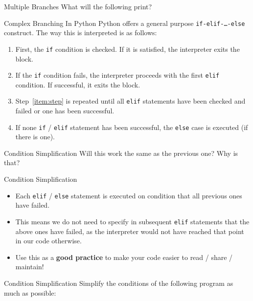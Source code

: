 \documentclass[aspectratio=169, 12pt, xcolor=table]{beamer}
\begin{document}
	\begin{frame}{Multiple Branches}
		What will the following print?
		
	\end{frame}

	\begin{frame}{Complex Branching In Python}
		Python offers a general purpose \texttt{if-elif-\ldots-else} construct. The way this is interpreted is as follows:
		\begin{enumerate}
			\item First, the \texttt{if} condition is checked. If it is satisfied, the interpreter exits the block.
			\item\label{item:step} If the \texttt{if} condition fails, the interpreter proceeds with the first \texttt{elif} condition. If successful, it exits the block.
			\item Step~\ref{item:step} is repeated until all \texttt{elif} statements have been checked and failed or one has been successful.
			\item If none \texttt{if} / \texttt{elif} statement has been successful, the \texttt{else} case is executed (if there is one).
		\end{enumerate}
	\end{frame}

	\begin{frame}{Condition Simplification}
		Will this work the same as the previous one?
		\pause
		Why is that?
	\end{frame}

	\begin{frame}{Condition Simplification}
		\begin{itemize}
			\item Each \texttt{elif} / \texttt{else} statement is executed on condition that all previous ones have failed.
			\item This means we do not need to specify in subsequent \texttt{elif} statements that the above ones have failed, as the interpreter would not have reached that point in our code otherwise.
			\item Use this as a \textbf{good practice} to make your code easier to read / share / maintain!
		\end{itemize}
	\end{frame}

	\begin{frame}{Condition Simplification}
		Simplify the conditions of the following program as much as possible:
		
	\end{frame}
\end{document}
